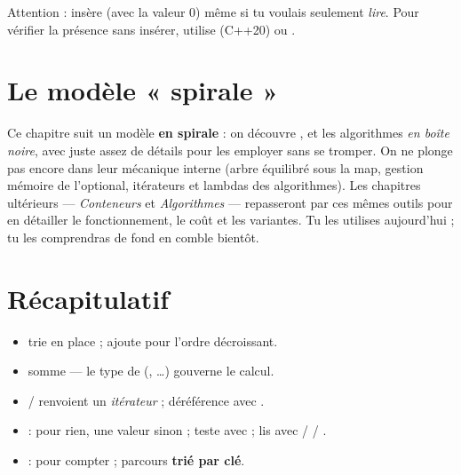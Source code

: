 \documentclass[11pt]{article}
\begin{document}
\begin{piege}
Attention :  insère  (avec la valeur 0) même si
tu voulais seulement \emph{lire}. Pour vérifier la présence sans insérer, utilise
 (C++20) ou .
\end{piege}

\section{Le modèle « spirale »}

\begin{aretenir}
Ce chapitre suit un modèle \textbf{en spirale} : on découvre ,
 et les algorithmes \emph{en boîte noire}, avec juste assez
de détails pour les employer sans se tromper. On ne plonge pas encore dans leur
mécanique interne (arbre équilibré sous la map, gestion mémoire de l'optional,
itérateurs et lambdas des algorithmes). Les chapitres ultérieurs —
\emph{Conteneurs} et \emph{Algorithmes} — repasseront par ces mêmes outils pour
en détailler le fonctionnement, le coût et les variantes. Tu les utilises
aujourd'hui ; tu les comprendras de fond en comble bientôt.
\end{aretenir}

\section{Récapitulatif}

\begin{itemize}[noitemsep]
    \item {} trie en place ; ajoute 
          pour l'ordre décroissant.
    \item {} somme — le type de 
          (, \ldots) gouverne le calcul.
    \item {}/ renvoient un
          \emph{itérateur} ; déréférence avec \code{*}.
    \item {} :  pour rien, une valeur
          sinon ; teste avec  ; lis avec  /
           / .
    \item {} :  pour compter ; parcours
           \textbf{trié par clé}.
\end{itemize}
\end{document}
